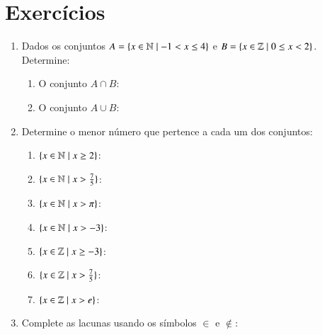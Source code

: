 \newpage

\section{Exercícios}
\begin{enumerate}
 \item Dados os conjuntos $A = \{x \in \mathbb{N} \mid -1 < x \leq 4 \}$ e $B = \{ x \in \mathbb{Z} \mid 0 \leq x < 2\}$. Determine:
 \begin{enumerate}
 \item O conjunto $A \cap B$:
 \item O conjunto $A \cup B$:
 \end{enumerate}

 \item Determine o menor número que pertence a cada um dos conjuntos:
 \begin{enumerate}
 \item $\{x \in \mathbb{N} \mid x \geq 2 \}$:
 \item $\{x \in \mathbb{N} \mid x > \frac{7}{5} \}$:
 \item $\{x \in \mathbb{N} \mid x > \pi \}$:
 \item $\{x \in \mathbb{N} \mid x > -3 \}$:
 \item $\{x \in \mathbb{Z} \mid x \geq -3 \}$:
 \item $\{x \in \mathbb{Z} \mid x > \frac{7}{5} \}$:
 \item $\{x \in \mathbb{Z} \mid x > e \}$:
 \end{enumerate}

 \item Complete as lacunas usando os símbolos $\in$ e $\notin$:
 \begin{enumerate}
 \end{enumerate}


\end{enumerate}
